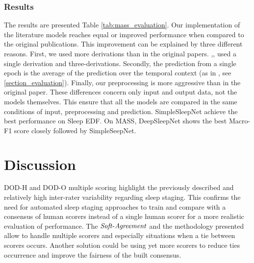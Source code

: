 \documentclass[journal]{IEEEtran}
\begin{document}
\subsubsection{Results} The results are presented Table \ref{tab:mass_evaluation}. Our implementation of the literature models reaches equal or improved performance when compared to the original publications. This improvement can be explained by three different reasons. First, we used more derivations than in the original papers. \cite{Tsinalis2016a},\cite{Tsinalis2016},\cite{Supratak2017} used a single derivation and \cite{Phan2019} three-derivations. Secondly, the prediction from a single epoch is the average of the prediction over the temporal context (as in \cite{Phan2019}, see \ref{section_evaluation}). Finally, our preprocessing is more aggressive than in the original paper. These differences concern only input and output data, not the models themselves. This ensure that all the models are compared in the same conditions of input, preprocessing and prediction.
SimpleSleepNet achieve the best performance on Sleep EDF. On MASS, DeepSleepNet shows the best Macro-F1 score closely followed by SimpleSeepNet.
 
\section{Discussion}

DOD-H and DOD-O multiple scoring highlight the previously described and relatively high inter-rater variability regarding sleep staging. This confirms the need for automated sleep staging approaches to train and compare with a consensus of human scorers instead of a single human scorer for a more realistic evaluation of performance. The ${\operatorname{\mathit{Soft-Agreement}}}$ and the methodology presented allow to handle multiple scorers and especially situations when a tie between scorers occurs. Another solution could be using yet more scorers to reduce ties occurrence and improve the fairness of the built consensus.
\end{document}
